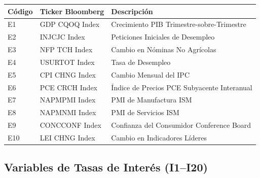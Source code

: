 \documentclass[11pt,a4paper]{article}
\begin{document}
\small
\begin{longtable}{lp{3.5cm}p{7.5cm}}
\toprule
\textbf{Código} & \textbf{Ticker Bloomberg} & \textbf{Descripción} \\
\midrule
\endhead
E1 & GDP CQOQ Index & Crecimiento PIB Trimestre-sobre-Trimestre \\
E2 & INJCJC Index & Peticiones Iniciales de Desempleo \\
E3 & NFP TCH Index & Cambio en Nóminas No Agrícolas \\
E4 & USURTOT Index & Tasa de Desempleo \\
E5 & CPI CHNG Index & Cambio Mensual del IPC \\
E6 & PCE CRCH Index & Índice de Precios PCE Subyacente Interanual \\
E7 & NAPMPMI Index & PMI de Manufactura ISM \\
E8 & NAPMNMI Index & PMI de Servicios ISM \\
E9 & CONCCONF Index & Confianza del Consumidor Conference Board \\
E10 & LEI CHNG Index & Cambio en Indicadores Líderes \\
\bottomrule
\end{longtable}
\normalsize

\subsection{Variables de Tasas de Interés (I1--I20)}
\end{document}
